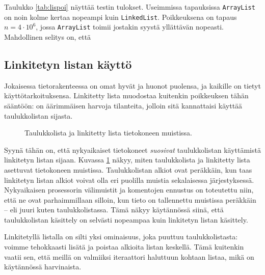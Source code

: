 Taulukko \ref{tab:lispoi} näyttää testin tulokset.
Useimmissa tapauksissa \texttt{ArrayList} on noin kolme
kertaa nopeampi kuin \texttt{LinkedList}.
Poikkeuksena on tapaus $n=4 \cdot 10^6$, jossa
\texttt{ArrayList} toimii jostakin syystä yllättävän nopeasti.
Mahdollinen selitys on, että 

\subsection{Linkitetyn listan käyttö}

Jokaisessa tietorakenteessa on omat hyvät ja huonot puolensa,
ja kaikille on tietyt käyttötarkoituksensa.
Linkitetty lista muodostaa kuitenkin poikkeuksen tähän sääntöön:
on äärimmäisen harvoja tilanteita, jolloin sitä kannattaisi
käyttää taulukkolistan sijasta.

\begin{figure}
\center
{}
\caption{Taulukkolista ja linkitetty lista tietokoneen muistissa.}
\label{fig:taulin}
\end{figure}

Syynä tähän on, että nykyaikaiset tietokoneet
\emph{suosivat} taulukkolistan käyttämistä linkitetyn listan sijaan.
Kuvassa \ref{fig:taulin} näkyy, miten taulukkolista ja linkitetty lista
asettuvat tietokoneen muistissa.
Taulukkolistan alkiot ovat peräkkäin, kun taas linkitetyn
listan alkiot voivat olla eri puolilla muistia sekalaisessa
järjestyksessä.
Nykyaikaisen prosessorin välimuistit ja komentojen ennustus
on toteutettu niin, että ne ovat parhaimmillaan silloin,
kun tieto on tallennettu muistissa peräkkäin -- eli juuri kuten
taulukkolistassa.
Tämä näkyy käytännössä siinä, että taulukkolistan käsittely on selvästi
nopeampaa kuin linkitetyn listan käsittely.

Linkitetyllä listalla on silti yksi ominaisuus,
joka puuttuu taulukkolistasta: voimme tehokkaasti
lisätä ja poistaa alkioita listan keskellä.
Tämä kuitenkin vaatii sen, että meillä on valmiiksi
iteraattori haluttuun kohtaan listaa,
mikä on käytännössä harvinaista.